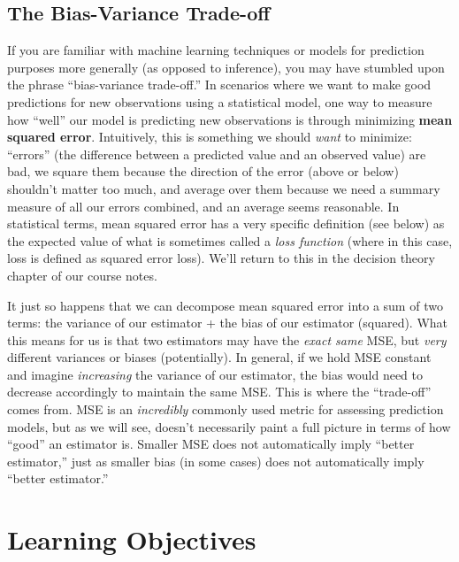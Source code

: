 \documentclass[
  letterpaper,
  DIV=11,
  numbers=noendperiod]{scrreprt}
\begin{document}
\hypertarget{the-bias-variance-trade-off}{%
\subsection*{The Bias-Variance
Trade-off}\label{the-bias-variance-trade-off}}

If you are familiar with machine learning techniques or models for
prediction purposes more generally (as opposed to inference), you may
have stumbled upon the phrase ``bias-variance trade-off.'' In scenarios
where we want to make good predictions for new observations using a
statistical model, one way to measure how ``well'' our model is
predicting new observations is through minimizing \textbf{mean squared
error}. Intuitively, this is something we should \emph{want} to
minimize: ``errors'' (the difference between a predicted value and an
observed value) are bad, we square them because the direction of the
error (above or below) shouldn't matter too much, and average over them
because we need a summary measure of all our errors combined, and an
average seems reasonable. In statistical terms, mean squared error has a
very specific definition (see below) as the expected value of what is
sometimes called a \emph{loss function} (where in this case, loss is
defined as squared error loss). We'll return to this in the decision
theory chapter of our course notes.

It just so happens that we can decompose mean squared error into a sum
of two terms: the variance of our estimator + the bias of our estimator
(squared). What this means for us is that two estimators may have the
\emph{exact same} MSE, but \emph{very} different variances or biases
(potentially). In general, if we hold MSE constant and imagine
\emph{increasing} the variance of our estimator, the bias would need to
decrease accordingly to maintain the same MSE. This is where the
``trade-off'' comes from. MSE is an \emph{incredibly} commonly used
metric for assessing prediction models, but as we will see, doesn't
necessarily paint a full picture in terms of how ``good'' an estimator
is. Smaller MSE does not automatically imply ``better estimator,'' just
as smaller bias (in some cases) does not automatically imply ``better
estimator.''

\hypertarget{learning-objectives-3}{%
\section{Learning Objectives}\label{learning-objectives-3}}
\end{document}
